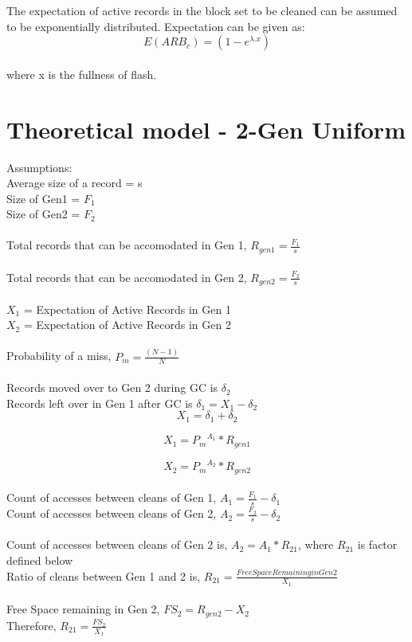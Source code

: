 \documentclass[11pt]{report} %
\begin{document}
The expectation of active records in the block set to be cleaned can be assumed to be exponentially distributed. Expectation can be given as: $$E(ARB_c) = (1 - e^{\lambda . x})$$\\
where x is the fullness of flash.
\\


\section{Theoretical model - 2-Gen Uniform}
Assumptions:\\
Average size of a record = s\\
Size of Gen1 = $F_1$\\
Size of Gen2 = $F_2$\\
\\
Total records that can be accomodated in Gen 1, $R_{gen1} = \frac{F_1}{s} $\\
\\
Total records that can be accomodated in Gen 2, $R_{gen2} = \frac{F_2}{s}$\\
\\
$X_1$ = Expectation of Active Records in Gen 1\\
$X_2$ = Expectation of Active Records in Gen 2\\
\\
Probability of a miss, $P_m = \frac{(N - 1)}{N}$\\
\\
Records moved over to Gen 2 during GC is $\delta_2$\\
Records left over in Gen 1 after GC is $\delta_1 = X_1 - \delta_2$\\
\begin{equation}X_1 = \delta_1 + \delta_2\end{equation}

\begin{equation}X_1 = {P_m}^{A_1} * R_{gen1}\end{equation}

\begin{equation}X_2 = {P_m}^{A_2} * R_{gen2}\end{equation}
\\
Count of accesses between cleans of Gen 1, $A_1 = \frac{F_1}{s} - \delta_1$\\
Count of accesses between cleans of Gen 2, $A_2 = \frac{F_2}{s} - \delta_2$\\
\\
Count of accesses between cleans of Gen 2 is, $A_2 = A_1 * R_{21}$, where $R_{21}$ is factor defined below\\
Ratio of cleans between Gen 1 and 2 is, $R_{21} = \frac{Free Space Remaining in Gen 2}{X_1}$\\
\\
Free Space remaining in Gen 2, $FS_2 = R_{gen2} - X_2$\\
Therefore, $R_{21} = \frac{FS_2}{X_1}$\\
\end{document}
